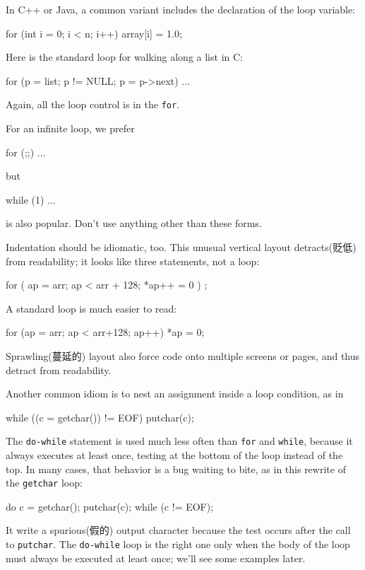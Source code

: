 In C++ or Java, a common variant includes the declaration of the loop
variable:
\begin{wellcode}
    for (int i = 0; i < n; i++)
        array[i] = 1.0;
\end{wellcode}
Here is the standard loop for walking along a list in C:
\begin{wellcode}
    for (p = list; p != NULL; p = p->next)
        ...
\end{wellcode}
Again, all the loop control is in the \verb'for'.

For an infinite loop, we prefer 
\begin{wellcode}
    for (;;)
        ...
\end{wellcode}
but 
\begin{wellcode}
    while (1)
        ...
\end{wellcode}
is also popular. Don't use anything other than these forms.

Indentation should be idiomatic, too. This unusual vertical layout
detracts(贬低) from readability; it looks like three statements, not a loop:
\begin{badcode}
    for (
        ap = arr;
        ap < arr + 128;
        *ap++ = 0
        )
    {
        ;
    }
\end{badcode}
A standard loop is much easier to read:
\begin{wellcode}
    for (ap = arr; ap < arr+128; ap++)
        *ap = 0;
\end{wellcode}
Sprawling(蔓延的) layout also force code onto multiple screens or pages,
and thus detract from readability.

Another common idiom is to nest an assignment inside a loop condition, as
in 
\begin{wellcode}
    while ((c = getchar()) != EOF)
        putchar(c);
\end{wellcode}
The \verb'do-while' statement is used much less often than \verb'for' and
\verb'while', because it always executes at least once, testing at the
bottom of the loop instead of the top. In many cases, that behavior is a
bug waiting to bite, as in this rewrite of the \verb'getchar' loop:
\begin{badcode}
    do {
        c = getchar();
        putchar(c);
    } while (c != EOF);
\end{badcode}
It write a spurious(假的) output character because the test occurs after
the call to \verb'putchar'. The \verb'do-while' loop is the right one only
when the body of the loop must always be executed at least once; we'll see
some examples later.

